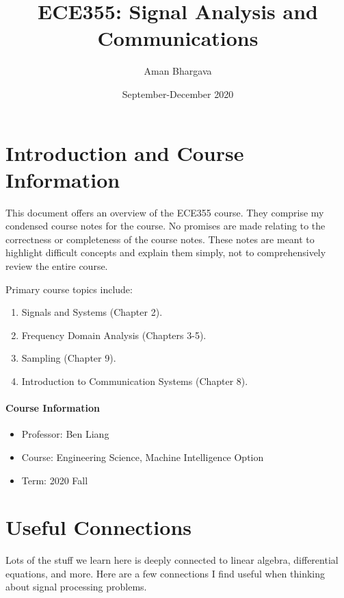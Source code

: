 \documentclass[a4paper,12pt]{report}
\begin{document}
\title{ECE355: Signal Analysis and Communications}
\author{Aman Bhargava}
\date{September-December 2020}
\maketitle

\tableofcontents

\section{Introduction and Course Information}

This document offers an overview of the ECE355 course. They comprise my condensed course notes for the course. No promises are made relating to the correctness or completeness of the course notes. These notes are meant to highlight difficult concepts and explain them simply, not to comprehensively review the entire course.

Primary course topics include:

\begin{enumerate}
\item Signals and Systems (Chapter 2).
\item Frequency Domain Analysis (Chapters 3-5).
\item Sampling (Chapter 9).
\item Introduction to Communication Systems (Chapter 8).
\end{enumerate}

\paragraph{Course Information}
\begin{itemize}
\item Professor: Ben Liang
\item Course: Engineering Science, Machine Intelligence Option
\item Term: 2020 Fall
\end{itemize}


\section{Useful Connections}

Lots of the stuff we learn here is deeply connected to linear algebra, differential equations, and more. Here are a few connections I find useful when thinking about signal processing problems. 
\end{document}
